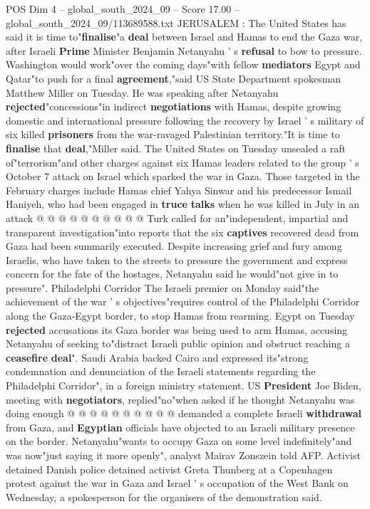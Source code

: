 \begin{textsample}{POS Dim 4 – global\_south\_2024\_09 – Score 17.00 – global\_south\_2024\_09/113689588.txt}  \label{ex:f4_pos_279}
JERUSALEM : The United States has said it is time to"\textbf{finalise}"a \textbf{deal} between Israel and Hamas to end the Gaza war, after Israeli \textbf{Prime} Minister Benjamin Netanyahu ' s \textbf{refusal} to bow to pressure.
Washington would work"over the coming days"with fellow \textbf{mediators} Egypt and Qatar"to push for a final \textbf{agreement},"said US State Department spokesman Matthew Miller on Tuesday.
He was speaking after Netanyahu \textbf{rejected}"concessions"in indirect \textbf{negotiations} with Hamas, despite growing domestic and international pressure following the recovery by Israel ' s military of six killed \textbf{prisoners} from the war-ravaged Palestinian territory."It is time to \textbf{finalise} that \textbf{deal},"Miller said.
The United States on Tuesday unsealed a raft of"terrorism"and other charges against six Hamas leaders related to the group ' s October 7 attack on Israel which sparked the war in Gaza.
Those targeted in the February charges include Hamas chief Yahya Sinwar and his predecessor Ismail Haniyeh, who had been engaged in \textbf{truce} \textbf{talks} when he was killed in July in an attack @ @ @ @ @ @ @ @ @ @ Turk called for an"independent, impartial and transparent investigation"into reports that the six \textbf{captives} recovered dead from Gaza had been summarily executed.
Despite increasing grief and fury among Israelis, who have taken to the streets to pressure the government and express concern for the fate of the hostages, Netanyahu said he would"not give in to pressure".
Philadelphi Corridor The Israeli premier on Monday said"the achievement of the war ' s objectives"requires control of the Philadelphi Corridor along the Gaza-Egypt border, to stop Hamas from rearming.
Egypt on Tuesday \textbf{rejected} accusations its Gaza border was being used to arm Hamas, accusing Netanyahu of seeking to"distract Israeli public opinion and obstruct reaching a \textbf{ceasefire} \textbf{deal}".
Saudi Arabia backed Cairo and expressed its"strong condemnation and denunciation of the Israeli statements regarding the Philadelphi Corridor", in a foreign ministry statement.
US \textbf{President} Joe Biden, meeting with \textbf{negotiators}, replied"no"when asked if he thought Netanyahu was doing enough @ @ @ @ @ @ @ @ @ @ demanded a complete Israeli \textbf{withdrawal} from Gaza, and \textbf{Egyptian} officials have objected to an Israeli military presence on the border.
Netanyahu"wants to occupy Gaza on some level indefinitely"and was now"just saying it more openly", analyst Mairav Zonszein told AFP.
Activist detained Danish police detained activist Greta Thunberg at a Copenhagen protest against the war in Gaza and Israel ' s occupation of the West Bank on Wednesday, a spokesperson for the organisers of the demonstration said.

\end{textsample}
